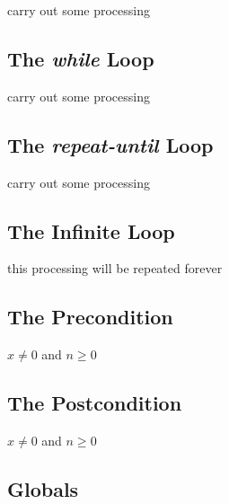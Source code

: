 \documentclass{amsart}
\begin{document}
\begin{algorithmic}[1]
    \STATE carry out some processing 
\ENDFOR
\end{algorithmic}

\subsection{The \emph{while} Loop}

\begin{algorithmic}[1]
    \STATE carry out some processing 
\ENDWHILE
\end{algorithmic}

\subsection{The \emph{repeat-until} Loop}

\begin{algorithmic}[1]
\REPEAT
    \STATE carry out some processing 
\end{algorithmic}

\subsection{The Infinite Loop}

\begin{algorithmic}[1]
\LOOP
    \STATE this processing will be repeated forever
\ENDLOOP
\end{algorithmic}

\subsection{The Precondition}

\begin{algorithmic}[1]
\REQUIRE $x \neq 0$ and $n \geq 0$
\end{algorithmic}

\subsection{The Postcondition}

\begin{algorithmic}[1]
    \ENSURE $x \neq 0$ and $n \geq 0$
\end{algorithmic}

\subsection{Globals}
\end{document}
